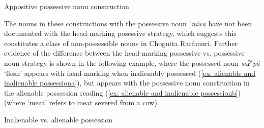 \ea\label{ex: periphrastic construction niwa}
{Appositive possessive noun construction}\\

    \z
\z

The nouns in these constructions with the possessive noun \textit{ˈníwa} have not been documented with the head-marking posessive strategy, which suggests this constitutes a class of non-possessible nouns in Choguita Rarámuri. Further evidence of the difference between the head-marking possessive vs. possessive noun strategy is shown in the following example, where the possessed noun \textit{saʔˈpá} ‘flesh’ appears with head-marking when inalienably possessed (\ref{ex: alienable and inalienable possessiona}), but appears with the possessive noun construction in the alienable possession reading (\ref{ex: alienable and inalienable possessionb}) (where `meat' refers to meat severed from a cow).

\ea\label{ex: alienable and inalienable possession}
{Inalienable vs. alienable possession}\\

